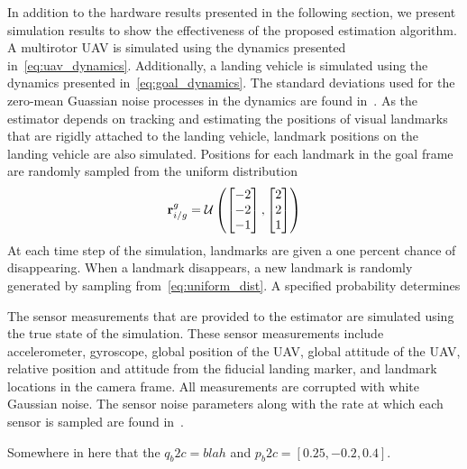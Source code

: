 
In addition to the hardware results presented in the following section, we
present simulation results to show the effectiveness of the proposed estimation
algorithm.
A multirotor UAV is simulated using the dynamics presented
in~\eqref{eq:uav_dynamics}.
Additionally, a landing vehicle is simulated using the dynamics presented
in~\eqref{eq:goal_dynamics}. The standard deviations used for the zero-mean
Guassian noise processes in the dynamics are found
in~.
As the estimator depends on
tracking and estimating the positions of visual landmarks that are rigidly
attached to the landing vehicle, landmark positions on the landing vehicle
are also simulated.
Positions for each landmark in the goal frame are
randomly sampled from the
uniform distribution
\begin{equation}
  \vect{r}_{i/g}^g = \mathcal{U}
  \left( \begin{bmatrix} -2 \\ -2 \\ -1 \end{bmatrix},
  \begin{bmatrix} 2 \\ 2 \\ 1 \end{bmatrix} \right)
  \label{eq:uniform_dist}
\end{equation}
At each time step of the simulation, landmarks are given a one percent chance
of disappearing. When a landmark disappears, a new landmark is randomly
generated by sampling from~\eqref{eq:uniform_dist}.
A specified probability determines

The sensor measurements that are provided to the estimator are simulated using the true
state of the simulation. These sensor measurements include accelerometer,
gyroscope, global position of the UAV, global attitude 
of the UAV, relative position and attitude from the fiducial landing marker, and
landmark locations in the camera frame. All measurements are
corrupted with white Gaussian noise. The sensor noise parameters along with the
rate at which each sensor is sampled are found
in~.

Somewhere in here that the $q_b2c = blah$ and $p_b2c = [0.25, -0.2, 0.4]$.

